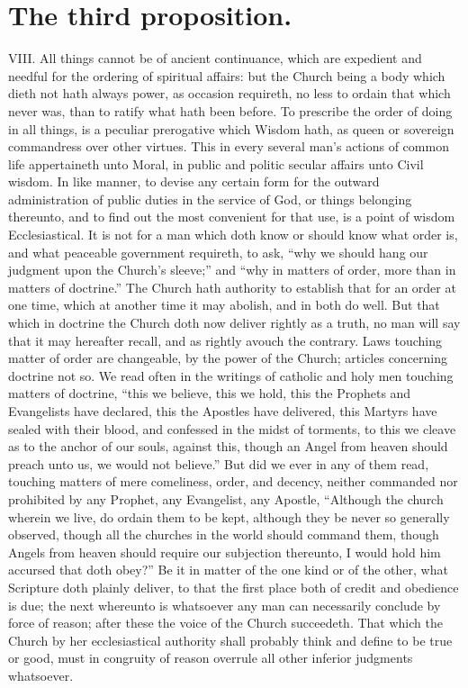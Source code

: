 \section*{The third proposition.}
VIII. All things cannot be of ancient continuance, which are expedient and needful for the ordering of spiritual affairs: but the Church being a body which dieth not hath always power, as occasion requireth, no less to ordain that which never was, than to ratify what hath been before. To prescribe the order of doing in all things, is a peculiar prerogative which Wisdom hath, as queen or sovereign commandress over other virtues. This in every several man’s actions of common life appertaineth unto Moral, in public and politic secular affairs unto Civil wisdom. In like manner, to devise any certain form for the outward administration of public duties in the service of God, or things belonging thereunto, and to find out the most convenient for that use, is a point of wisdom Ecclesiastical.
It is not for a man which doth know or should know what order is, and what peaceable government requireth, to ask, “why we should hang our judgment upon the Church’s sleeve;” and “why in matters of order, more than in matters of doctrine.” The Church hath authority to establish that for an order at one time, which at another time it may abolish, and in both do well. But that which in doctrine the Church doth now deliver rightly as a truth, no man will say that it may hereafter recall, and as rightly avouch the contrary. Laws touching matter of order are changeable, by the power of the Church; articles concerning doctrine not so. We read often in the writings of catholic  and holy men touching matters of doctrine, “this we believe, this we hold, this the Prophets and Evangelists have declared, this the Apostles have delivered, this Martyrs have sealed with their blood, and confessed in the midst of torments, to this we cleave as to the anchor of our souls, against this, though an Angel from heaven should preach unto us, we would not believe.” But did we ever in any of them read, touching matters of mere comeliness, order, and decency, neither commanded nor prohibited by any Prophet, any Evangelist, any Apostle, “Although the church wherein we live, do ordain them to be kept, although they be never so generally observed, though all the churches in the world should command them, though Angels from heaven should require our subjection thereunto, I would hold him accursed that doth obey?” Be it in matter of the one kind or of the other, what Scripture doth plainly deliver, to that the first place both of credit and obedience is due; the next whereunto is whatsoever any man can necessarily conclude by force of reason; after these the voice of the Church succeedeth. That which the Church by her ecclesiastical authority shall probably think and define to be true or good, must in congruity of reason overrule all other inferior judgments whatsoever.
